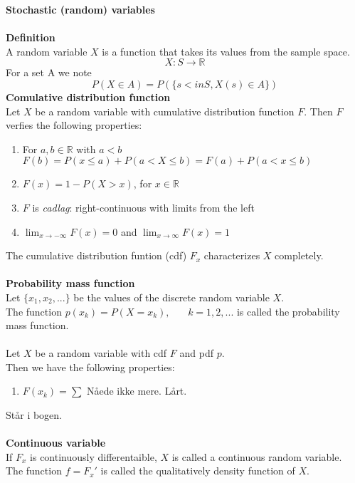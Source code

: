 \documentclass[12pt,a4paper,final]{report}
\author{Frederik Appel Vardinghus-Nielsen}
\begin{document}
\noindent \textbf{Stochastic (random) variables}\\\\
\textbf{Definition}\\
A random variable $X$ is a function that takes its values from the sample space.
\begin{equation}
X:S\to\mathbb{R}
\end{equation}
For a set A we note
\begin{equation}
P(X\in A)=P(\{s<in S,X(s)\in A\})
\end{equation}
\textbf{Comulative distribution function}\\
Let $X$ be a random variable with cumulative distribution function $F$. Then $F$ verfies the following properties:
\begin{enumerate}
\item For $a,b\in \mathbb{R}$ with $a<b$\\
$F(b)=P(x\leq a)+P(a<X\leq b)=F(a)+P(a<x\leq b)$
\item $F(x)=1-P(X>x)$, for $x\in \mathbb{R}$
\item $F$ is \textit{cadlag}: right-continuous with limits from the left
\item $\lim_{x\to -\infty}F(x)=0$ and $\lim_{x\to \infty}F(x)=1$
\end{enumerate}
The cumulative distribution funtion (cdf) $F_x$ characterizes $X$ completely.\\\\
\textbf{Probability mass function}\\
Let $\{x_1,x_2,...\}$ be the values of the discrete random variable $X$.\\
The function $p(x_k)=P(X=x_k),\phantom{mm}k=1,2,...$ is called the probability mass function.\\\\
Let $X$ be a random variable with cdf $F$ and pdf $p$.\\
Then we have the following properties:
\begin{enumerate}
\item $F(x_k)=\sum$ Nåede ikke mere. Lårt.
\end{enumerate}
Står i bogen.\\\\
\textbf{Continuous variable}\\
If $F_x$ is continuously differentaible, $X$ is called a continuous random variable.\\
The function $f=F_x'$ is called the qualitatively density function of $X$.\\\\
\end{document}
